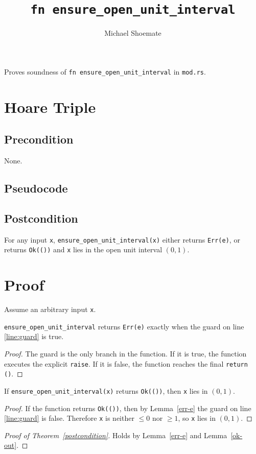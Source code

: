 \documentclass{article}
\title{\texttt{fn ensure\_open\_unit\_interval}}
\author{Michael Shoemate}
\begin{document}
\maketitle

Proves soundness of \texttt{fn ensure\_open\_unit\_interval} in \texttt{mod.rs}.

\section{Hoare Triple}
\subsection*{Precondition}
None.

\subsection*{Pseudocode}


\subsection*{Postcondition}
\begin{theorem}
\label{postcondition}
For any input \texttt{x}, \texttt{ensure\_open\_unit\_interval(x)} either returns \texttt{Err(e)},
or returns \texttt{Ok(())} and \texttt{x} lies in the open unit interval $(0,1)$.
\end{theorem}

\section{Proof}
Assume an arbitrary input \texttt{x}.

\begin{lemma}
\label{err-e}
\texttt{ensure\_open\_unit\_interval} returns \texttt{Err(e)} exactly when the guard on
line \ref{line:guard} is true.
\end{lemma}

\begin{proof}
The guard is the only branch in the function. If it is true, the function executes the explicit
\texttt{raise}. If it is false, the function reaches the final \texttt{return ()}.
\end{proof}

\begin{lemma}
\label{ok-out}
If \texttt{ensure\_open\_unit\_interval(x)} returns \texttt{Ok(())}, then \texttt{x} lies in
$(0,1)$.
\end{lemma}

\begin{proof}
If the function returns \texttt{Ok(())}, then by Lemma~\ref{err-e} the guard on
line \ref{line:guard} is false. Therefore \texttt{x} is neither $\le 0$ nor $\ge 1$, so
\texttt{x} lies in $(0,1)$.
\end{proof}

\begin{proof}[Proof of Theorem~\ref{postcondition}]
Holds by Lemma~\ref{err-e} and Lemma~\ref{ok-out}.
\end{proof}
\end{document}

